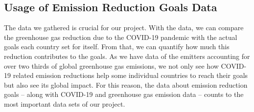 









\subsection{Usage of Emission Reduction Goals Data}
The data we gathered is crucial for our project. With the data, we can compare the greenhouse gas reduction due to the COVID-19 pandemic with the actual goals each country set for itself. From that, we can quantify how much this reduction contributes to the goals. As we have data of the emitters accounting for over two thirds of global greenhouse gas emissions, we not only see how COVID-19 related emission reductions help some individual countries to reach their goals but also see its global impact. For this reason, the data about emission reduction goals -- along with COVID-19 and greenhouse gas emission data -- counts to the most important data sets of our project.













